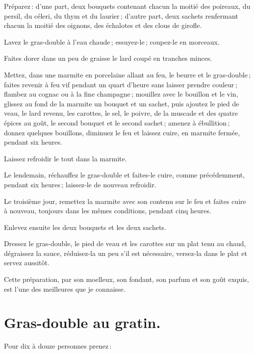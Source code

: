 Préparez : d'une part, deux bouquets contenant chacun la moitié des poireaux,
du persil, du céleri, du thym et du laurier ; d'autre part, deux sachets
renfermant chacun la moitié des oignons, des échalotes et des clous de girofle.

Lavez le gras-double à l'eau chaude ; essuyez-le ; coupez-le en morceaux.

Faites dorer dans un peu de graisse le lard coupé en tranches minces.

Mettez, dans une marmite en porcelaine allant au feu, le beurre et le
gras-double ; faites revenir à feu vif pendant un quart d'heure sans laisser
prendre couleur ; flambez au cognac ou à la fine champagne ; mouillez avec le
bouillon et le vin, glissez au fond de la marmite un bouquet et un sachet, puis
ajoutez le pied de veau, le lard revenu, les carottes, le sel, le poivre, de la
muscade et des quatre épices au goût, le second bouquet et le second sachet ;
amenez à ébullition ; donnez quelques bouillons, diminuez le feu et laissez
cuire, en marmite fermée, pendant six heures.

Laissez refroidir le tout dans la marmite.

Le lendemain, réchauffez le gras-double et faites-le cuire, comme précédemment,
pendant six heures ; laissez-le de nouveau refroidir.

Le troisième jour, remettez la marmite avec son contenu sur le feu et faites
cuire à nouveau, toujours dans les mêmes conditions, pendant cinq heures.

Enlevez ensuite les deux bouquets et les deux sachets.

Dressez le gras-double, le pied de veau et les carottes sur un plat tenu au chaud,
dégraissez la sauce, réduisez-la un peu s'il est nécessaire, versez-la dans le plat et
servez aussitôt.

Cette préparation, par son moelleux, son fondant, son parfum et son goût
exquis, est l'une des meilleures que je connaisse.

\section*{\centering Gras-double au gratin.}

Pour dix à douze personnes prenez :

\medskip

